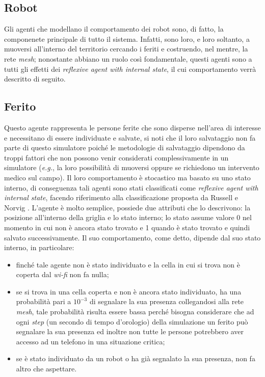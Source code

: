 \subsection{Robot}
\label{sub:robots}
Gli agenti che modellano il comportamento dei robot sono, di fatto, la componenete principale di tutto il sistema.
Infatti, sono loro, e loro soltanto, a muoversi all'interno del territorio cercando i feriti e costruendo, nel mentre, la rete \textit{mesh}; nonostante abbiano un ruolo così fondamentale, questi agenti sono a tutti gli effetti dei \textit{reflexive agent with internal state}, il cui comportamento verrà descritto di seguito.

\subsection{Ferito}
Questo agente rappresenta le persone ferite che sono disperse nell'area di interesse e necessitano di essere individuate e salvate, si noti che il loro salvataggio non fa parte di questo simulatore poiché le metodologie di salvataggio dipendono da troppi fattori che non possono venir considerati complessivamente in un simulatore (\textit{e.g.}, la loro possibilità di muoversi oppure se richiedono un intervento medico sul campo).
Il loro comportamento è stocastico ma basato su uno stato interno, di conseguenza tali agenti sono stati classificati come \textit{reflexive agent with internal state}, facendo riferimento alla classificazione proposta da Russell e Norvig \cite{russell2016}.
L'agente è molto semplice, possiede due attributi che lo descrivono: la posizione all'interno della griglia e lo stato interno; lo stato assume valore 0 nel momento in cui non è ancora stato trovato e 1 quando è stato trovato e quindi salvato successivamente.
Il suo comportamento, come detto, dipende dal suo stato interno, in particolare: 
\begin{itemize}
	\item finché tale agente non è stato individuato e la cella in cui si trova non è coperta dal \textit{wi-fi} non fa nulla;
	\item se si trova in una cella coperta e non è ancora stato individuato, ha una probabilità pari a $10^{-3}$ di segnalare la sua presenza collegandosi alla rete \textit{mesh}, tale probabilità risulta essere bassa perché bisogna considerare che ad ogni \textit{step} (un secondo di tempo d'orologio) della simulazione un ferito può segnalare la sua presenza ed inoltre non tutte le persone potrebbero aver accesso ad un telefono in una situazione critica;
	\item se è stato individuato da un robot o ha già segnalato la sua presenza, non fa altro che aspettare.
\end{itemize}
